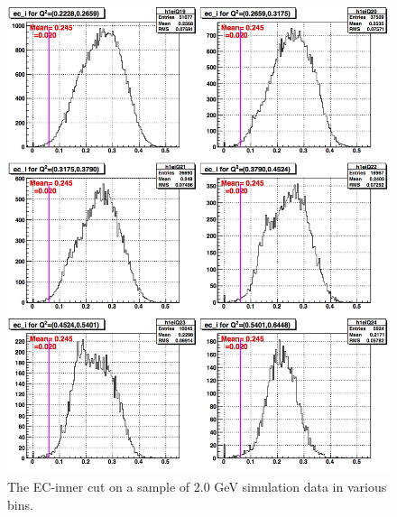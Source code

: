 \begin{figure}[H]%
\centering
\leavevmode \includegraphics[width=1.0\textwidth]{figuresEG4/FigCuts/ecCuts_eiOneD_Eb2_4ThsimN.png}  %
\caption[EC inner energy cut (Sim.)]{The EC-inner cut on a sample of 2.0 GeV simulation data in various \qsqs bins.}
\label{ecInSim6}
\end{figure}

